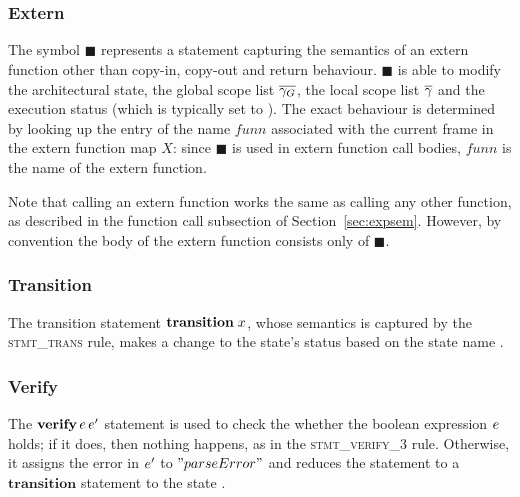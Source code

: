 \documentclass[UTF8]{article}
\begin{document}
\begin{figure}[h!]
    \ottusedrule{\ottdrulestmtXXseqOne{}} \\
    \ottusedrule{\ottdrulestmtXXseqTwo{}} \\
    \ottusedrule{\ottdrulestmtXXseqThree{}}
\end{figure}


\subsubsection*{Extern}
The symbol $\blacksquare$ represents a statement capturing the semantics of an extern function other than copy-in, copy-out and return behaviour. $\blacksquare$ is able to modify the architectural state, the global scope list $\overline{\gamma_G}$, the local scope list $\overline{\gamma}$ and the execution status (which is typically set to ). The exact behaviour is determined by looking up the entry of the name $\mathit{funn}$ associated with the current frame in the extern function map $X$: since $\blacksquare$ is used in extern function call bodies, $\mathit{funn}$ is the name of the extern function.

Note that calling an extern function works the same as calling any other function, as described in the function call subsection of Section~\ref{sec:expsem}. However, by convention the body of the extern function consists only of $\blacksquare$.

\begin{figure}[ht!]
    \ottusedrule{\ottdrulestmtXXext{}}
\end{figure}

\subsubsection*{Transition}
The transition statement $\mathbf{transition} \; x $, whose semantics is captured by the \textsc{stmt\_trans} rule, makes a change to the state's status \status{} based on the state name \vn{}.

\begin{figure}[ht!]
    \ottusedrule{\ottdrulestmtXXtrans{}} 
\end{figure}



\subsubsection*{Verify}
The $\mathbf{verify} \, e \, e'$ statement is used to check the whether the boolean expression $e$ holds; if it does, then nothing happens, as in the \textsc{stmt\_verify\_3} rule. Otherwise, it assigns the error in $e'$ to $"parseError"$ and reduces the statement to a $\mathbf{transition}$ statement to the state \reject{}.
 
\end{document}
